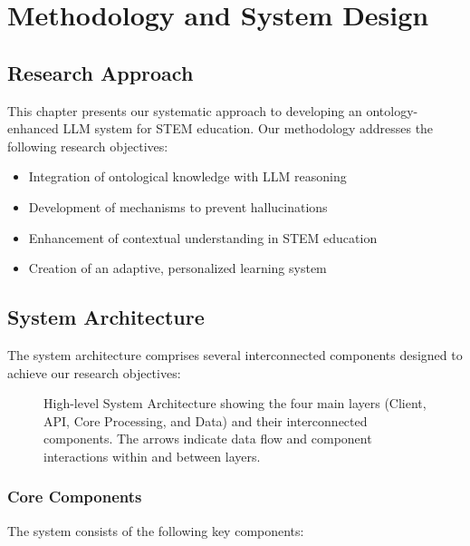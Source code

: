 \chapter{Methodology and System Design}
\label{chap:methodology}

\section{Research Approach}
This chapter presents our systematic approach to developing an ontology-enhanced LLM system for STEM education. Our methodology addresses the following research objectives:

\begin{itemize}
    \item Integration of ontological knowledge with LLM reasoning
    \item Development of mechanisms to prevent hallucinations
    \item Enhancement of contextual understanding in STEM education
    \item Creation of an adaptive, personalized learning system
\end{itemize}

\section{System Architecture}
\label{sec:system-architecture}

The system architecture comprises several interconnected components designed to achieve our research objectives:

\begin{figure}[htbp]
    \centering
    
    \caption{High-level System Architecture showing the four main layers (Client, API, Core Processing, and Data) and their interconnected components. The arrows indicate data flow and component interactions within and between layers.}
    \label{fig:system-architecture}
\end{figure}

\subsection{Core Components}
\label{subsec:core-components}

The system consists of the following key components:


